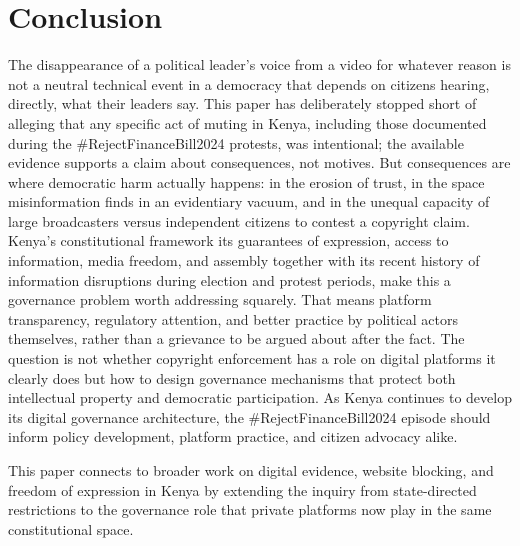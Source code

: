 \documentclass{article}
\begin{document}
\section{Conclusion}
The disappearance of a political leader’s voice from a video for whatever reason is not a neutral technical event in a democracy that depends on citizens hearing, directly, what their leaders say. This paper has deliberately stopped short of alleging that any specific act of muting in Kenya, including those documented during the \#RejectFinanceBill2024 protests, was intentional; the available evidence supports a claim about consequences, not motives. But consequences are where democratic harm actually happens: in the erosion of trust, in the space misinformation finds in an evidentiary vacuum, and in the unequal capacity of large broadcasters versus independent citizens to contest a copyright claim.
Kenya’s constitutional framework its guarantees of expression, access to information, media freedom, and assembly together with its recent history of information disruptions during election and protest periods, make this a governance problem worth addressing squarely. That means platform transparency, regulatory attention, and better practice by political actors themselves, rather than a grievance to be argued about after the fact. The question is not whether copyright enforcement has a role on digital platforms it clearly does but how to design governance mechanisms that protect both intellectual property and democratic participation. As Kenya continues to develop its digital governance architecture, the \#RejectFinanceBill2024 episode should inform policy development, platform practice, and citizen advocacy alike.
\par
This paper connects to broader work on digital evidence, website blocking, and freedom of expression in Kenya by extending the inquiry from state-directed restrictions to the governance role that private platforms now play in the same constitutional space.
\end{document}
